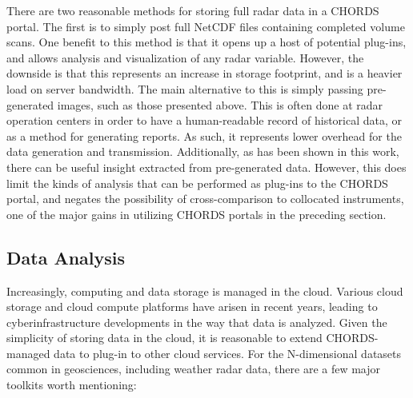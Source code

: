 There are two reasonable methods for storing full radar data in a CHORDS portal.
The first is to simply post full NetCDF files containing completed volume scans.
One benefit to this method is that it opens up a host of potential plug-ins, and allows analysis and visualization of any radar variable.
However, the downside is that this represents an increase in storage footprint, and is a heavier load on server bandwidth.
The main alternative to this is simply passing pre-generated images, such as those presented above.
This is often done at radar operation centers in order to have a human-readable record of historical data, or as a method for generating reports.
As such, it represents lower overhead for the data generation and transmission.
Additionally, as has been shown in this work, there can be useful insight extracted from pre-generated data.
However, this does limit the kinds of analysis that can be performed as plug-ins to the CHORDS portal, and negates the possibility of cross-comparison to collocated instruments, one of the major gains in utilizing CHORDS portals in the preceding section.

\subsection{Data Analysis}
\label{ssec:realtime_analysis}

Increasingly, computing and data storage is managed in the cloud.
Various cloud storage and cloud compute platforms have arisen in recent years, leading to cyberinfrastructure developments in the way that data is analyzed.
Given the simplicity of storing data in the cloud, it is reasonable to extend CHORDS-managed data to plug-in to other cloud services.
For the N-dimensional datasets common in geosciences, including weather radar data, there are a few major toolkits worth mentioning:

